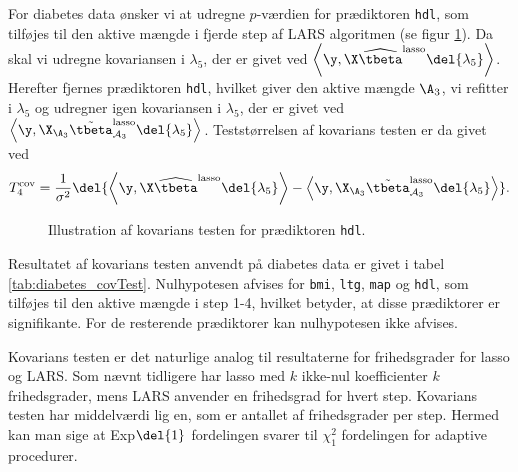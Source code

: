 \begin{eks}
For diabetes data ønsker vi at udregne \(p\)-værdien for prædiktoren \texttt{hdl}, som tilføjes til den aktive mængde i fjerde step af LARS algoritmen (se figur \ref{fig:diabetes_covTest}). 
Da skal vi udregne kovariansen i \(\lambda_5\), der er givet ved \(\left\langle \y, \X \widehat{\tbeta}^\text{lasso} \del{\lambda_5} \right\rangle\).
Herefter fjernes prædiktoren \texttt{hdl}, hvilket giver den aktive mængde \(\A_{3}\), vi refitter i \(\lambda_5\) og udregner igen kovariansen i \(\lambda_5\), der er givet ved \(\left\langle  \y, \X_{\A_{3}} \tilde{\tbeta}^\text{lasso}_{\mathcal{A}_{3}} \del{\lambda_{5}} \right\rangle\).
Teststørrelsen af kovarians testen er da givet ved
\begin{align*}
T_4^\text{cov} = \frac{1}{\sigma^2} \del{ \left\langle \y, \X \widehat{\tbeta}^\text{lasso} \del{\lambda_{5}} \right\rangle - \left\langle  \y, \X_{\A_{3}} \tilde{\tbeta}^\text{lasso}_{\mathcal{A}_{3}} \del{\lambda_{5}} \right\rangle}.
\end{align*}
%
\begin{figure}[H]
\centering
{}
\caption{Illustration af kovarians testen for prædiktoren \texttt{hdl}.} \label{fig:diabetes_covTest}
\end{figure}
%
Resultatet af kovarians testen anvendt på diabetes data er givet i tabel \ref{tab:diabetes_covTest}.
Nulhypotesen afvises for \texttt{bmi}, \texttt{ltg}, \texttt{map} og \texttt{hdl}, som tilføjes til den aktive mængde i step 1-4, hvilket betyder, at disse prædiktorer er signifikante.
For de resterende prædiktorer kan nulhypotesen ikke afvises.
%

\end{eks}

Kovarians testen er det naturlige analog til resultaterne for frihedsgrader for lasso og LARS.
Som nævnt tidligere har lasso med \(k\) ikke-nul koefficienter \(k\) frihedsgrader, mens LARS anvender en frihedsgrad for hvert step.
Kovarians testen har middelværdi lig en, som er antallet af frihedsgrader per step.
Hermed kan man sige at Exp\(\del{1}\) fordelingen svarer til \(\chi_1^2\) fordelingen for adaptive procedurer.

